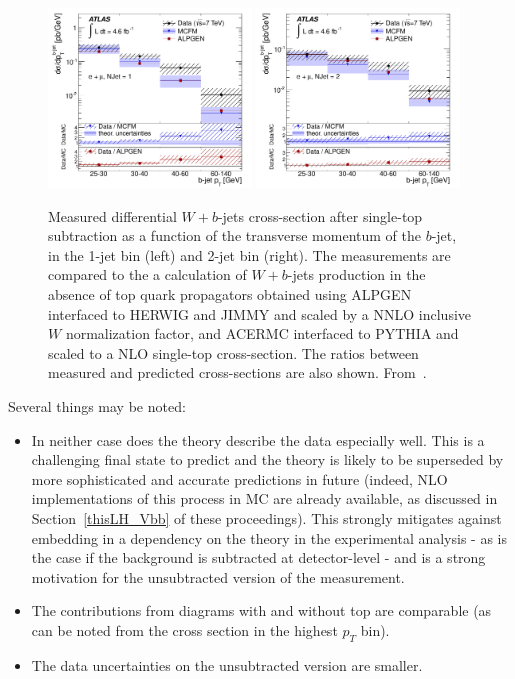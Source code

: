\documentclass[11pt]{cernrep}
\begin{document}
\begin{figure}
\centering
	\includegraphics[width=0.48\textwidth]{fig_08a.pdf}
	\includegraphics[width=0.48\textwidth]{fig_08b.pdf}
\caption{\label{fig:notop}
Measured differential $W+b$-jets cross-section after single-top subtraction as a function of the transverse momentum of the $b$-jet, in the 
1-jet bin (left) and 2-jet bin (right). 
The measurements are compared to the a calculation of $W+b$-jets production in the absence of top quark propagators obtained using ALPGEN interfaced to HERWIG and JIMMY and scaled by a NNLO inclusive $W$ normalization factor, and ACERMC interfaced to PYTHIA and scaled to a NLO single-top cross-section. 
The ratios between measured and predicted cross-sections are also shown. From~\protect\cite{Aad:2013vka}.}
\end{figure}

Several things may be noted:
\begin{itemize}
\item In neither case does the theory describe the data especially well. This is a challenging
final state to predict and the theory is likely to be superseded by more sophisticated and 
accurate predictions in future (indeed, NLO implementations of this
process in MC are already available, as discussed in
Section~\ref{thisLH_Vbb} of these proceedings). This strongly mitigates against embedding in a dependency 
on the theory in the experimental analysis - as is the case if the background is subtracted at detector-level - 
and is a strong motivation for the unsubtracted version of the
measurement. 
\item The contributions from diagrams 
with and without top are comparable (as can be noted from the cross section in the highest $p_T$ bin).
\item The data uncertainties on the unsubtracted version are smaller.
\end{itemize}
\end{document}
